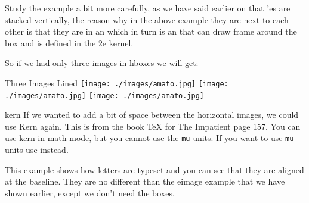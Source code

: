 Study the example a bit more carefully, as we have said earlier on that 'es are stacked vertically, the reason why in the above example they are next to each other is that they are in an
 which in turn is an   that can draw  frame around the box and is defined in the
\latex2e kernel.

So if we had only three images in hboxes we will get:

\begin{texexample}{Three Images Lined}{}
\leavevmode
\parindent30pt
\hbox{\texttt{[image: ./images/amato.jpg]}}%
\hbox{\texttt{[image: ./images/amato.jpg]}}%
\hbox{\texttt{[image: ./images/amato.jpg]}}%
\end{texexample}

\begin{docCommand}{kern}{}
If we wanted to add a bit of space between the horizontal images, we could use 
Kern again. This is from the book TeX for The Impatient page 157. You can use kern in math mode, but you cannot use the \texttt{mu} units. If you want to use \texttt{mu} units use  instead.
\end{docCommand}

\begin{texexample}{}{}
   \fboxsep=0pt
\end{texexample}

\begin{texexample}{}{}
   \HHUGE
   \fboxsep=0pt
\end{texexample}

This example shows how letters are typeset and you can see that they are aligned at the baseline. They are no different than the eimage example that we have shown earlier, except we don't need the boxes.

\medskip

